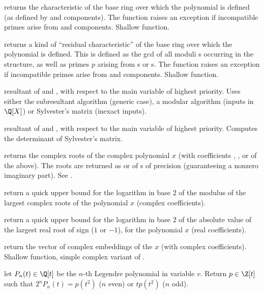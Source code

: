  returns the characteristic of the
base ring over which the polynomial is defined (as defined by 
and  components). The function raises an exception if incompatible
primes arise from  and  components. Shallow function.

 returns a kind of ``residual
characteristic'' of the base ring over which the polynomial is defined. This
is defined as the gcd of all moduli s occurring in the structure,
as well as primes $p$ arising from s or s. The function
raises an exception if incompatible primes arise from  and
 components. Shallow function.

 resultant of  and , with
respect to the main variable of highest priority. Uses either the
subresultant algorithm (generic case), a modular algorithm (inputs in
$\Q[X]$) or Sylvester's matrix (inexact inputs).

 resultant of  and , with
respect to the main variable of highest priority. Computes the determinant
of Sylvester's matrix.

 returns the complex roots of
the complex polynomial $x$ (with coefficients , ,
 or  of the above). The roots are returned
as  or  of s of precision 
(guaranteeing a nonzero imaginary part). See .

 return a quick upper bound for the
logarithm in base $2$ of the modulus of the largest complex roots of
the polynomial $x$ (complex coefficients).

 return a quick upper
bound for the logarithm in base $2$ of the absolute value of the largest
real root of sign  ($1$ or $-1$), for the polynomial $x$ (real
coefficients).

 return the vector of complex
embeddings of the  $x$ (with complex coefficients). Shallow
function, simple complex variant of .

 let $P_n(t)\in \Q[t]$
be the $n$-th Legendre polynomial in variable $v$. Return $p\in \Z[t]$
such that $2^n P_n(t) = p(t^2)$ ($n$ even) or $t p(t^2)$ ($n$ odd).

